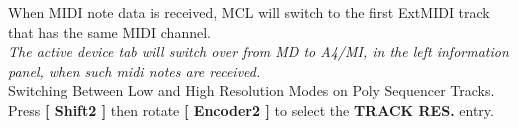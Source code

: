 When MIDI note data is received, MCL will switch to the first ExtMIDI track that has the same MIDI channel.
\\

\textit{The active device tab will switch over from MD to A4/MI, in the left information panel, when such midi notes are received.}
\\

Switching Between Low and High Resolution Modes on Poly Sequencer Tracks.
Press \textbf{[ Shift2 ]} then rotate \textbf{[ Encoder2 ]} to select the \textbf{TRACK RES.} entry.
